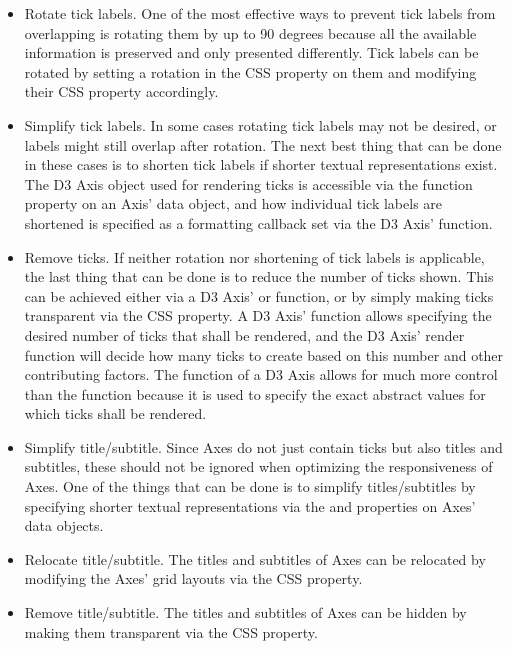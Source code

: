 \begin{itemize}

\item
Rotate tick labels.
One of the most effective ways to prevent tick labels from overlapping is rotating them by up to 90 degrees because all the available information is preserved and only presented differently.
Tick labels can be rotated by setting a rotation in the CSS  property on them and modifying their CSS  property accordingly. 

\item
Simplify tick labels.
In some cases rotating tick labels may not be desired, or labels might still overlap after rotation.
The next best thing that can be done in these cases is to shorten tick labels if shorter textual representations exist.
The D3 Axis object used for rendering ticks is accessible via the  function property on an Axis' data object, and how individual tick labels are shortened is specified as a formatting callback set via the D3 Axis'  function.

\item
Remove ticks.
If neither rotation nor shortening of tick labels is applicable, the last thing that can be done is to reduce the number of ticks shown.
This can be achieved either via a D3 Axis'  or  function, or by simply making ticks transparent via the CSS  property.
A D3 Axis'  function allows specifying the desired number of ticks that shall be rendered, and the D3 Axis' render function will decide how many ticks to create based on this number and other contributing factors.
The  function of a D3 Axis allows for much more control than the  function because it is used to specify the exact abstract values for which ticks shall be rendered.

\item
Simplify title/subtitle.
Since Axes do not just contain ticks but also titles and subtitles, these should not be ignored when optimizing the responsiveness of Axes.
One of the things that can be done is to simplify titles/subtitles by specifying shorter textual representations via the  and  properties on Axes' data objects.

\item
Relocate title/subtitle.
The titles and subtitles of Axes can be relocated by modifying the Axes' grid layouts via the CSS  property. 

\item
Remove title/subtitle.
The titles and subtitles of Axes can be hidden by making them transparent via the CSS  property.

\end{itemize}

